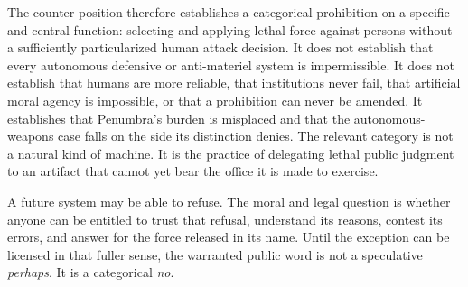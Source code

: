 \documentclass[11pt]{article}
\begin{document}
The counter-position therefore establishes a categorical prohibition on a specific and central function: selecting and applying lethal force against persons without a sufficiently particularized human attack decision. It does not establish that every autonomous defensive or anti-materiel system is impermissible. It does not establish that humans are more reliable, that institutions never fail, that artificial moral agency is impossible, or that a prohibition can never be amended. It establishes that Penumbra's burden is misplaced and that the autonomous-weapons case falls on the side its distinction denies. The relevant category is not a natural kind of machine. It is the practice of delegating lethal public judgment to an artifact that cannot yet bear the office it is made to exercise.

A future system may be able to refuse. The moral and legal question is whether anyone can be entitled to trust that refusal, understand its reasons, contest its errors, and answer for the force released in its name. Until the exception can be licensed in that fuller sense, the warranted public word is not a speculative \emph{perhaps}. It is a categorical \emph{no}.
\end{document}
